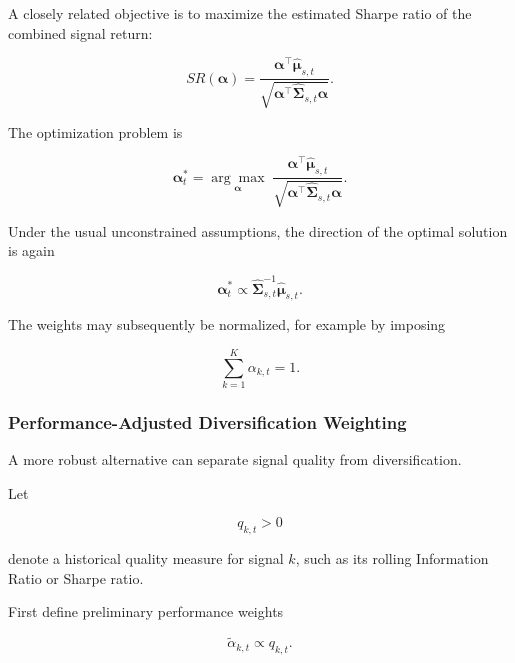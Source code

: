 \documentclass[11pt,a4paper]{article}
\begin{document}
A closely related objective is to maximize the estimated Sharpe ratio of the
combined signal return:

\begin{equation}
\boxed{
SR
\left(
\boldsymbol{\alpha}
\right)
=
\frac{
\boldsymbol{\alpha}^{\top}
\widehat{\boldsymbol{\mu}}_{s,t}
}{
\sqrt{
\boldsymbol{\alpha}^{\top}
\widehat{\boldsymbol{\Sigma}}_{s,t}
\boldsymbol{\alpha}
}
}.
}
\end{equation}

The optimization problem is

\begin{equation}
\boxed{
\boldsymbol{\alpha}_t^{*}
=
\underset{\boldsymbol{\alpha}}{\arg\max}
\;
\frac{
\boldsymbol{\alpha}^{\top}
\widehat{\boldsymbol{\mu}}_{s,t}
}{
\sqrt{
\boldsymbol{\alpha}^{\top}
\widehat{\boldsymbol{\Sigma}}_{s,t}
\boldsymbol{\alpha}
}
}.
}
\end{equation}

Under the usual unconstrained assumptions, the direction of the optimal
solution is again

\begin{equation}
\boxed{
\boldsymbol{\alpha}_t^{*}
\propto
\widehat{\boldsymbol{\Sigma}}_{s,t}^{-1}
\widehat{\boldsymbol{\mu}}_{s,t}.
}
\end{equation}

The weights may subsequently be normalized, for example by imposing

\begin{equation}
\sum_{k=1}^{K}
\alpha_{k,t}=1.
\end{equation}


\subsubsection{Performance-Adjusted Diversification Weighting}

A more robust alternative can separate signal quality from diversification.

Let

\begin{equation}
q_{k,t}>0
\end{equation}

denote a historical quality measure for signal $k$, such as its rolling
Information Ratio or Sharpe ratio.

First define preliminary performance weights

\begin{equation}
\widetilde{\alpha}_{k,t}
\propto
q_{k,t}.
\end{equation}
\end{document}
